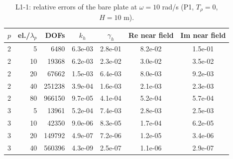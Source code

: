 \begin{table}[htbp]
\centering
\caption{L1-1: relative errors of the bare plate at $\omega = 10$ rad/s (P1, $T_\rho = 0$, $H = 10$ m).}
\label{tab:L1-1}
\begin{tabular}{rrrcccc}
\toprule
$p$ & el./$\lambda_p$ & DOFs & $k_h$ & $\gamma_h$ & Re near field & Im near field \\
\midrule
2 & 5 & 6480 & 6.3e-03 & 2.8e-01 & 8.2e-02 & 1.5e-01 \\
2 & 10 & 19368 & 6.2e-03 & 2.3e-02 & 3.0e-02 & 3.5e-02 \\
2 & 20 & 67662 & 1.5e-03 & 6.4e-03 & 8.0e-03 & 9.2e-03 \\
2 & 40 & 251238 & 3.9e-04 & 1.6e-03 & 2.1e-03 & 2.3e-03 \\
2 & 80 & 966150 & 9.7e-05 & 4.1e-04 & 5.2e-04 & 5.7e-04 \\
3 & 5 & 13961 & 5.2e-04 & 7.4e-03 & 2.8e-03 & 2.5e-03 \\
3 & 10 & 42350 & 9.0e-06 & 8.3e-05 & 1.7e-04 & 6.2e-05 \\
3 & 20 & 149792 & 4.9e-07 & 7.2e-06 & 1.2e-05 & 3.4e-06 \\
3 & 40 & 560396 & 4.3e-09 & 2.5e-07 & 1.1e-06 & 2.9e-07 \\
\bottomrule
\end{tabular}
\end{table}
